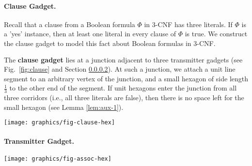 \documentclass[10pt]{CSUNthesis}
\theoremstyle{plain}%
\theoremstyle{definition}
\theoremstyle{remark}
\begin{document}
\paragraph{Clause Gadget.}
Recall that a clause from a Boolean formula $\Phi$ in 3-CNF has three literals.  If $\Phi$ is a  'yes' instance, then at least one literal in every clause of $\Phi$ is true.  We construct the clause gadget to model this fact about Boolean formulas in 3-CNF.

The {\bf clause gadget} lies at a junction adjacent to three transmitter gadgets (see Fig.~\ref{fig:clause} and Section \ref{transmitterGadget}). 
At such a junction, we attach a unit line segment to an arbitrary vertex of the junction, and a small hexagon of side length $\frac{1}{3}$ to the other end of the segment. 
If unit hexagons enter the junction from all three corridors (i.e., all three literals are false), then there is no space left for the small hexagon (see Lemma \ref{lem:aux-1}).

\begin{minipage}{\linewidth}
\begin{center}
\texttt{[image: graphics/fig-clause-hex]}
\label{fig:clause}
\end{center}
\end{minipage}


\paragraph{Transmitter Gadget.\newline }\label{transmitterGadget}

\begin{minipage}{\linewidth}
\begin{center}
\texttt{[image: graphics/fig-assoc-hex]}
\label{fig:assoc2}
\end{center}
\end{minipage}
\end{document}
